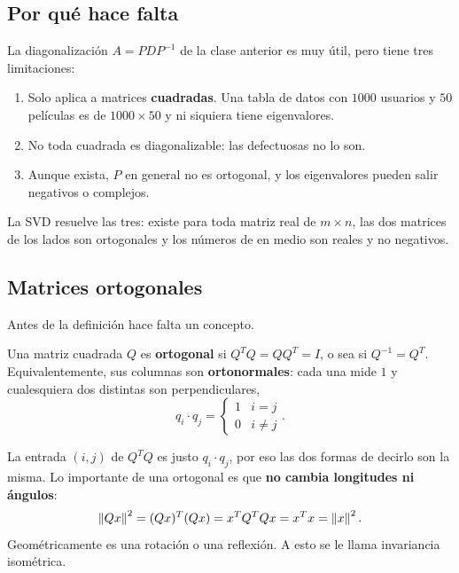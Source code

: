 \documentclass[11pt,letterpaper]{article}
\begin{document}
\subsection*{Por qué hace falta}

La diagonalización $A = PDP^{-1}$ de la clase anterior es muy útil,
pero tiene tres limitaciones:

\begin{enumerate}[itemsep=0.2em]
    \item Solo aplica a matrices \textbf{cuadradas}. Una tabla de
          datos con $1000$ usuarios y $50$ películas es de
          $1000 \times 50$ y ni siquiera tiene eigenvalores.
    \item No toda cuadrada es diagonalizable: las defectuosas no lo
          son.
    \item Aunque exista, $P$ en general no es ortogonal, y los
          eigenvalores pueden salir negativos o complejos.
\end{enumerate}

La SVD resuelve las tres: existe para toda matriz real de
$m \times n$, las dos matrices de los lados son ortogonales y los
números de en medio son reales y no negativos.


\subsection*{Matrices ortogonales}

Antes de la definición hace falta un concepto.

\begin{definicion}
    Una matriz cuadrada $Q$ es \textbf{ortogonal} si
    $Q^{T}Q = QQ^{T} = I$, o sea si $Q^{-1} = Q^{T}$. Equivalentemente,
    sus columnas son \textbf{ortonormales}: cada una mide $1$ y
    cualesquiera dos distintas son perpendiculares,
    \[
        q_i \cdot q_j = \begin{cases} 1 & i = j \\ 0 & i \neq j
        \end{cases} .
    \]
\end{definicion}

La entrada $(i, j)$ de $Q^{T}Q$ es justo $q_i \cdot q_j$, por eso las
dos formas de decirlo son la misma. Lo importante de una ortogonal es
que \textbf{no cambia longitudes ni ángulos}:
\[
    \left\lVert Qx \right\rVert^2 = (Qx)^{T}(Qx) = x^{T}Q^{T}Qx = x^{T}x = \left\lVert x \right\rVert^2 .
\]
Geométricamente es una rotación o una reflexión. A esto se le llama
invariancia isométrica.
\end{document}

